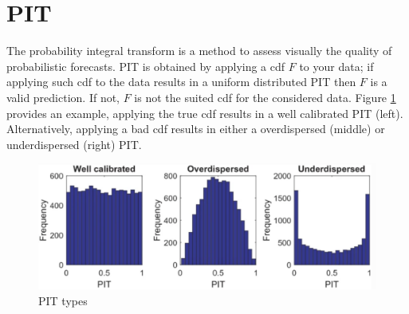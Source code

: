 \section{PIT}
The probability integral transform is a method to assess visually the quality of probabilistic forecasts. PIT is obtained by applying a cdf $F$ to your data; if applying such cdf to the data results in a uniform distributed PIT then $F$ is a valid prediction. If not, $F$ is not the suited cdf for the considered data. Figure \ref{fig:pit} provides an example, applying the true cdf results in a well calibrated PIT (left). Alternatively, applying a bad cdf results in either a overdispersed (middle) or underdispersed (right) PIT.
\begin{figure}
    \includegraphics[width=\textwidth]{images/pit.png}
    \caption{PIT types \cite{haben2023core}}
    \label{fig:pit}
  \end{figure}
\\

